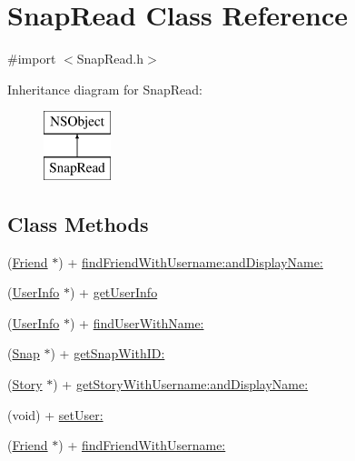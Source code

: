 \hypertarget{interface_snap_read}{}\section{Snap\+Read Class Reference}
\label{interface_snap_read}


{\ttfamily \#import $<$Snap\+Read.\+h$>$}

Inheritance diagram for Snap\+Read\+:\begin{figure}[H]
\begin{center}
\leavevmode
\includegraphics[height=2.000000cm]{interface_snap_read}
\end{center}
\end{figure}
\subsection*{Class Methods}
\begin{DoxyCompactItemize}
\item 
(\hyperlink{interface_friend}{Friend} $\ast$) + \hyperlink{interface_snap_read_aa9519f2ed3e05cf57b6feec74e6cd4b2}{find\+Friend\+With\+Username\+:and\+Display\+Name\+:}
\item 
(\hyperlink{interface_user_info}{User\+Info} $\ast$) + \hyperlink{interface_snap_read_a9282ffeb874dc7bd1dbfa8f6b30ff6a9}{get\+User\+Info}
\item 
(\hyperlink{interface_user_info}{User\+Info} $\ast$) + \hyperlink{interface_snap_read_a9b72eb8481516f541f4d9447ae335a63}{find\+User\+With\+Name\+:}
\item 
(\hyperlink{interface_snap}{Snap} $\ast$) + \hyperlink{interface_snap_read_a6344aec7f2fa64dca5a03cf17965c0f4}{get\+Snap\+With\+I\+D\+:}
\item 
(\hyperlink{interface_story}{Story} $\ast$) + \hyperlink{interface_snap_read_afd0c4d40ba860bc9b408c7338d3e5112}{get\+Story\+With\+Username\+:and\+Display\+Name\+:}
\item 
(void) + \hyperlink{interface_snap_read_aa6ebb46023ca7715d2f229c144e2195d}{set\+User\+:}
\item 
(\hyperlink{interface_friend}{Friend} $\ast$) + \hyperlink{interface_snap_read_a9ea52ef4b82202a8d3b03fb3f3269bce}{find\+Friend\+With\+Username\+:}
\end{DoxyCompactItemize}


